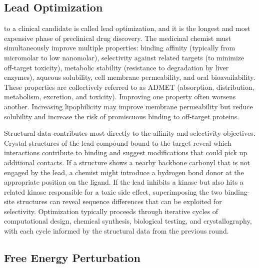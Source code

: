\subsection{Lead Optimization}
\label{sec:lead-opt}

 to a clinical candidate is called lead optimization, and it is the longest and most expensive phase of preclinical drug discovery. The medicinal chemist must simultaneously improve multiple properties: binding affinity (typically from micromolar to low nanomolar), selectivity against related targets (to minimize off-target toxicity), metabolic stability (resistance to degradation by liver enzymes), aqueous solubility, cell membrane permeability, and oral bioavailability. These properties are collectively referred to as ADMET (absorption, distribution, metabolism, excretion, and toxicity). Improving one property often worsens another. Increasing lipophilicity may improve membrane permeability but reduce solubility and increase the risk of promiscuous binding to off-target proteins.

Structural data contributes most directly to the affinity and selectivity objectives. Crystal structures of the lead compound bound to the target reveal which interactions contribute to binding and suggest modifications that could pick up additional contacts. If a structure shows a nearby backbone carbonyl that is not engaged by the lead, a chemist might introduce a hydrogen bond donor at the appropriate position on the ligand. If the lead inhibits a kinase but also hits a related kinase responsible for a toxic side effect, superimposing the two binding-site structures can reveal sequence differences that can be exploited for selectivity. Optimization typically proceeds through iterative cycles of computational design, chemical synthesis, biological testing, and crystallography, with each cycle informed by the structural data from the previous round.


\subsection{Free Energy Perturbation}
\label{sec:fep}

